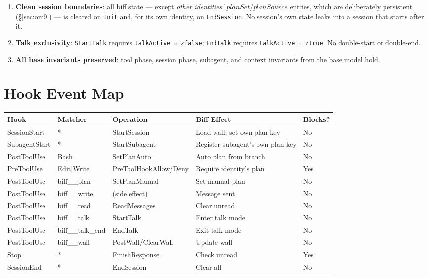 \documentclass[a4paper,10pt,fleqn]{article}
\begin{document}
\begin{enumerate}
  \item \textbf{Clean session boundaries}: all biff state --- except
    \emph{other identities'} $planSet$/$planSource$ entries, which are
    deliberately persistent (\S\ref{sec:om9}) --- is cleared on
    \texttt{Init} and, for its own identity, on \texttt{EndSession}. No
    session's own state leaks into a session that starts after it.

  \item \textbf{Talk exclusivity}: \texttt{StartTalk} requires
    \texttt{talkActive = zfalse}; \texttt{EndTalk} requires
    \texttt{talkActive = ztrue}. No double-start or double-end.

  \item \textbf{All base invariants preserved}: tool phase, session
    phase, subagent, and context invariants from the base model hold.
\end{enumerate}

\section{Hook Event Map}

\begin{tabular}{lllll}
\hline
\textbf{Hook} & \textbf{Matcher} & \textbf{Operation} & \textbf{Biff Effect} & \textbf{Blocks?} \\
\hline
SessionStart & * & StartSession & Load wall; set own plan key & No \\
SubagentStart & * & StartSubagent & Register subagent's own plan key & No \\
PostToolUse & Bash & SetPlanAuto & Auto plan from branch & No \\
PreToolUse & Edit|Write & PreToolHookAllow/Deny & Require identity's plan & Yes \\
PostToolUse & biff\_\_plan & SetPlanManual & Set manual plan & No \\
PostToolUse & biff\_\_write & (side effect) & Message sent & No \\
PostToolUse & biff\_\_read & ReadMessages & Clear unread & No \\
PostToolUse & biff\_\_talk & StartTalk & Enter talk mode & No \\
PostToolUse & biff\_\_talk\_end & EndTalk & Exit talk mode & No \\
PostToolUse & biff\_\_wall & PostWall/ClearWall & Update wall & No \\
Stop & * & FinishResponse & Check unread & Yes \\
SessionEnd & * & EndSession & Clear all & No \\
\hline
\end{tabular}
\end{document}
